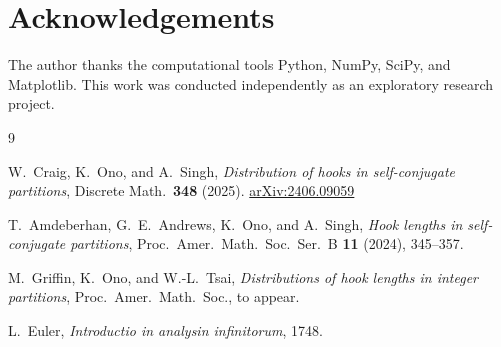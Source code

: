 \documentclass[11pt,reqno]{amsart}
\begin{document}
\section*{Acknowledgements}

The author thanks the computational tools Python, NumPy, 
SciPy, and Matplotlib. This work was conducted 
independently as an exploratory research project.

\begin{thebibliography}{9}

W.~Craig, K.~Ono, and A.~Singh,
\textit{Distribution of hooks in self-conjugate partitions},
Discrete Math.\ \textbf{348} (2025).
\href{https://arxiv.org/abs/2406.09059}{arXiv:2406.09059}

T.~Amdeberhan, G.~E.~Andrews, K.~Ono, and A.~Singh,
\textit{Hook lengths in self-conjugate partitions},
Proc.\ Amer.\ Math.\ Soc.\ Ser.\ B \textbf{11} (2024), 345--357.

M.~Griffin, K.~Ono, and W.-L.~Tsai,
\textit{Distributions of hook lengths in integer partitions},
Proc.\ Amer.\ Math.\ Soc., to appear.

L.~Euler,
\textit{Introductio in analysin infinitorum},
1748.

\end{thebibliography}
\end{document}
